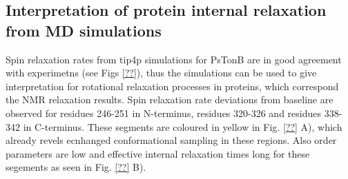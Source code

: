 \documentclass[pre,aps,floatfix,authordate1-4,twocolumn]{revtex4-1}
\begin{document}
\subsection{Interpretation of protein internal relaxation from MD simulations}
Spin relaxation rates from tip4p simulations for PsTonB are in good agreement with
experimetns (see Figs \ref{??}), thus the simulations can be used to give interpretation
for rotational relaxation processes in proteins, which correspond the
NMR relaxation results. Spin relaxation rate deviations from baseline
are observed for residues 246-251 in N-terminus, residues 320-326
and residues 338-342 in C-terminus. These segments are coloured in yellow
in Fig. \ref{??} A), which already revels ecnhanged conformational sampling
in these regions. Also order parameters are low and effective internal
relaxation times long for these segements as seen in Fig. \ref{??} B).
\end{document}
